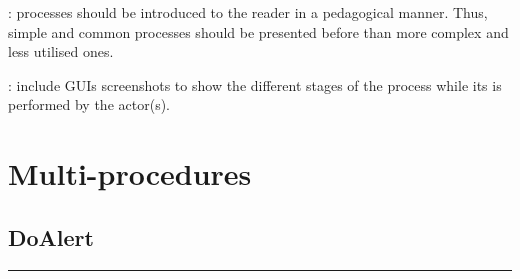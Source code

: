 : processes should be introduced to the
reader in a pedagogical manner. Thus, simple and common processes should be presented before
than more complex and less utilised ones.

: include GUIs screenshots to show the
different stages of the process while its is performed by the actor(s).


\section{Multi-procedures}

\subsection{DoAlert}
\vspace{0.5cm}
\hrule
